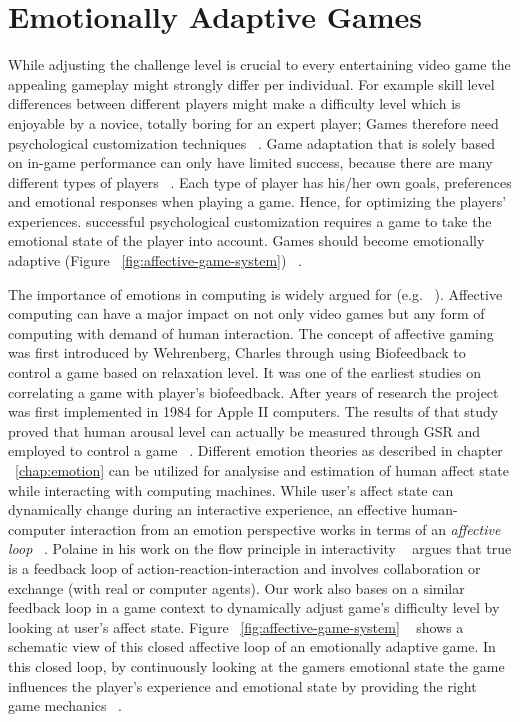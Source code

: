 \section{Emotionally Adaptive Games}

While adjusting the challenge level is crucial to every entertaining video game the appealing gameplay might strongly differ per individual. For example skill level differences between different players might make a difficulty level which is enjoyable by a novice, totally boring for an expert player; Games therefore need psychological customization techniques ~\cite{saari2005towards}. Game adaptation that is solely based on in-game performance can only have limited success, because there are many different types of players ~\cite{bartle1996hearts}. Each type of player has his/her own goals, preferences and emotional responses when playing a game. Hence, for optimizing the players' experiences. successful psychological customization requires a game to take the emotional state of the player into account. Games should become emotionally adaptive (Figure ~\ref{fig:affective-game-system}) ~\cite{tijs2009creating}.

The importance of emotions in computing is widely argued for (e.g. ~\cite{picard2003affective}). Affective computing can have a major impact on not only video games but any form of computing with demand of human interaction. The concept of affective gaming was first introduced by Wehrenberg, Charles through using Biofeedback to control a game based on relaxation level. It was one of the earliest studies on correlating a game with player's biofeedback. After years of research the project was first implemented in 1984 for Apple II computers. The results of that study proved that human arousal level can actually be measured through GSR and employed to control a game ~\cite{wehrenberg1995willball}. Different emotion theories as described in chapter ~\ref{chap:emotion} can be utilized for analysise and estimation of human affect state while interacting with computing machines. While user's affect state can dynamically change during an interactive experience, an effective human-computer interaction from an emotion perspective works in terms of an \textit{affective loop} ~\cite{sundstrom2005user}. Polaine in his work on the flow principle in interactivity ~\cite{polaine2005flow} argues that true is a feedback loop of action-reaction-interaction and involves collaboration or exchange (with real or computer agents). Our work also bases on a similar feedback loop in a game context to dynamically adjust game's difficulty level by looking at user's affect state. Figure ~\ref{fig:affective-game-system} ~\cite{tijs2009creating} shows a schematic view of this closed affective loop of an emotionally adaptive game. In this closed loop, by continuously looking at the gamers emotional state the game influences the player's experience and emotional state by providing the right game mechanics ~\cite{hunicke2004mda}.

